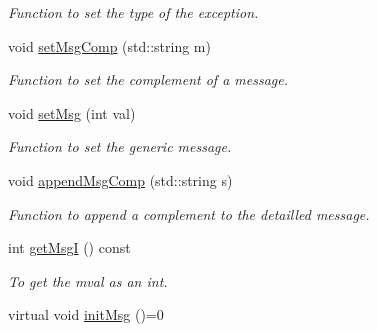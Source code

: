 \begin{DoxyCompactItemize}
\begin{DoxyCompactList}\small\item\em Function to set the type of the exception. \item\end{DoxyCompactList}\item 
void \hyperlink{classVishnuException_a07556bed229d900b994cb9dcdbf2984f}{setMsgComp} (std::string m)
\begin{DoxyCompactList}\small\item\em Function to set the complement of a message. \item\end{DoxyCompactList}\item 
void \hyperlink{classVishnuException_a5a18ccd681b23f9b3c444bb69962ed24}{setMsg} (int val)
\begin{DoxyCompactList}\small\item\em Function to set the generic message. \item\end{DoxyCompactList}\item 
void \hyperlink{classVishnuException_a0f1a2665f54991986429c32bd905ceed}{appendMsgComp} (std::string s)
\begin{DoxyCompactList}\small\item\em Function to append a complement to the detailled message. \item\end{DoxyCompactList}\item 
\hypertarget{classVishnuException_ac17d2964e09c2df48c8ce3e88e1127eb}{
int \hyperlink{classVishnuException_ac17d2964e09c2df48c8ce3e88e1127eb}{getMsgI} () const }
\label{classVishnuException_ac17d2964e09c2df48c8ce3e88e1127eb}

\begin{DoxyCompactList}\small\item\em To get the mval as an int. \item\end{DoxyCompactList}\item 
\hypertarget{classVishnuException_a2efc99faea879e45b372787a96ced5dd}{
virtual void \hyperlink{classVishnuException_a2efc99faea879e45b372787a96ced5dd}{initMsg} ()=0}
\label{classVishnuException_a2efc99faea879e45b372787a96ced5dd}


\end{DoxyCompactItemize}
